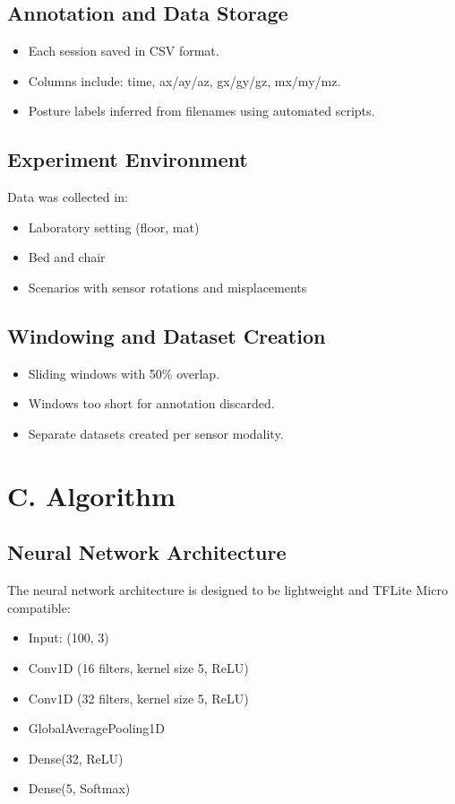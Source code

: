 \documentclass[12pt]{article}
\begin{document}
\subsection*{Annotation and Data Storage}
\begin{itemize}
    \item Each session saved in CSV format.
    \item Columns include: time, ax/ay/az, gx/gy/gz, mx/my/mz.
    \item Posture labels inferred from filenames using automated scripts.
\end{itemize}

\subsection*{Experiment Environment}
Data was collected in:
\begin{itemize}
    \item Laboratory setting (floor, mat)
    \item Bed and chair
    \item Scenarios with sensor rotations and misplacements
\end{itemize}

\subsection*{Windowing and Dataset Creation}
\begin{itemize}
    \item Sliding windows with 50\% overlap.
    \item Windows too short for annotation discarded.
    \item Separate datasets created per sensor modality.
\end{itemize}

\section*{C. Algorithm}

\subsection*{Neural Network Architecture}
The neural network architecture is designed to be lightweight and TFLite Micro compatible:
\begin{itemize}
    \item Input: (100, 3)
    \item Conv1D (16 filters, kernel size 5, ReLU)
    \item Conv1D (32 filters, kernel size 5, ReLU)
    \item GlobalAveragePooling1D
    \item Dense(32, ReLU)
    \item Dense(5, Softmax)
\end{itemize}
\end{document}
